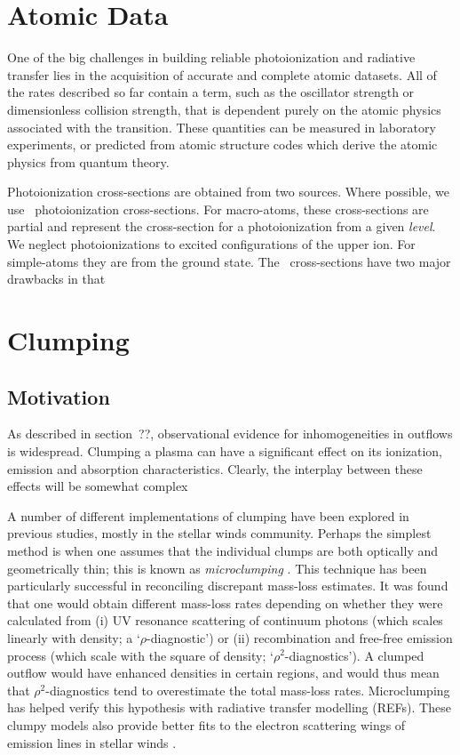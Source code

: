\section{Atomic Data}

One of the big challenges in building reliable photoionization and radiative
transfer lies in the acquisition of accurate and complete atomic datasets.
All of the rates described so far contain a term, such as the oscillator strength 
or dimensionless collision strength, that is dependent purely on the atomic physics
associated with the transition. These quantities can be measured in laboratory experiments,
or predicted from atomic structure codes which derive the atomic physics from 
quantum theory.

Photoionization cross-sections are obtained from two sources. Where possible,
we use \top\ photoionization cross-sections. For macro-atoms,
these cross-sections are partial and represent the cross-section for a photoionization
from a given {\em level}. We neglect photoionizations to excited configurations
of the upper ion. For simple-atoms they are from the ground state.
The \top\ cross-sections have two major drawbacks in that 





\section{Clumping}

\label{sec:microclumping}

\subsection{Motivation}

As described in section~??, observational evidence for inhomogeneities in 
outflows is widespread. Clumping a plasma can have a significant effect on its
ionization, emission and absorption characteristics. Clearly, the interplay between
these effects will be somewhat complex 

A number of different implementations of clumping have been explored in previous studies,
mostly in the stellar winds community. Perhaps the simplest method is 
when one assumes that the individual clumps are both optically and geometrically thin;
this is known as {\em microclumping} \citep[e.g.][]{hamann1998,hilliermiller1999,hamann2008}. 
This technique has been particularly successful in reconciling 
discrepant mass-loss estimates.
It was found that one would obtain different mass-loss rates depending on whether
they were calculated from (i) UV resonance scattering of continuum photons 
(which scales linearly with density; a `$\rho$-diagnostic') or (ii) recombination 
and free-free emission process (which scale with the square of density; 
`$\rho^2$-diagnostics'). A clumped outflow would have enhanced densities in 
certain regions, and would thus mean that $\rho^2$-diagnostics tend to 
overestimate the total mass-loss rates. Microclumping has helped verify this
hypothesis with radiative transfer modelling (REFs). These clumpy models also
provide better fits to the electron scattering wings of emission lines in stellar
winds \citep{hillier1991}.

